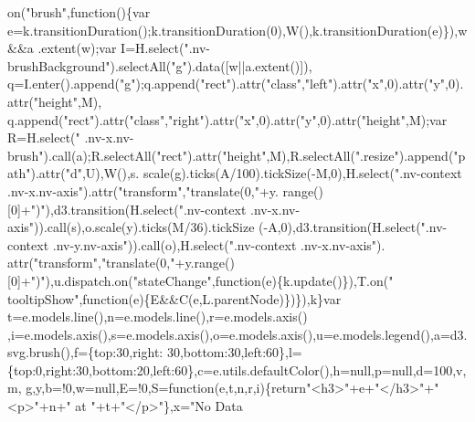 \begin{DoxyCode}
{      on(\textcolor{stringliteral}{"brush"},\textcolor{keyword}{function}()\{var e=k.transitionDuration();k.transitionDuration(0),W(),k.transitionDuration(e)\}),w&&a
      .extent(w);var I=H.select(\textcolor{stringliteral}{".nv-brushBackground"}).selectAll(\textcolor{stringliteral}{"g"}).data([w||a.extent()]),
      q=I.enter().append(\textcolor{stringliteral}{"g"});q.append(\textcolor{stringliteral}{"rect"}).attr(\textcolor{stringliteral}{"class"},\textcolor{stringliteral}{"left"}).attr(\textcolor{stringliteral}{"x"},0).attr(\textcolor{stringliteral}{"y"},0).attr(\textcolor{stringliteral}{"height"},M),
      q.append(\textcolor{stringliteral}{"rect"}).attr(\textcolor{stringliteral}{"class"},\textcolor{stringliteral}{"right"}).attr(\textcolor{stringliteral}{"x"},0).attr(\textcolor{stringliteral}{"y"},0).attr(\textcolor{stringliteral}{"height"},M);var R=H.select(\textcolor{stringliteral}{"
      .nv-x.nv-brush"}).call(a);R.selectAll(\textcolor{stringliteral}{"rect"}).attr(\textcolor{stringliteral}{"height"},M),R.selectAll(\textcolor{stringliteral}{".resize"}).append(\textcolor{stringliteral}{"path"}).attr(\textcolor{stringliteral}{"d"},U),W(),s.
      scale(g).ticks(A/100).tickSize(-M,0),H.select(\textcolor{stringliteral}{".nv-context .nv-x.nv-axis"}).attr(\textcolor{stringliteral}{"transform"},\textcolor{stringliteral}{"translate(0,"}+y.
      range()[0]+\textcolor{stringliteral}{")"}),d3.transition(H.select(\textcolor{stringliteral}{".nv-context .nv-x.nv-axis"})).call(s),o.scale(y).ticks(M/36).tickSize
      (-A,0),d3.transition(H.select(\textcolor{stringliteral}{".nv-context .nv-y.nv-axis"})).call(o),H.select(\textcolor{stringliteral}{".nv-context .nv-x.nv-axis"}).
      attr(\textcolor{stringliteral}{"transform"},\textcolor{stringliteral}{"translate(0,"}+y.range()[0]+\textcolor{stringliteral}{")"}),u.dispatch.on(\textcolor{stringliteral}{"stateChange"},\textcolor{keyword}{function}(e)\{k.update()\}),T.on(\textcolor{stringliteral}{"
      tooltipShow"},\textcolor{keyword}{function}(e)\{E&&C(e,L.parentNode)\})\}),k\}var t=e.models.line(),n=e.models.line(),r=e.models.axis()
      ,i=e.models.axis(),s=e.models.axis(),o=e.models.axis(),u=e.models.legend(),a=d3.svg.brush(),f=\{top:30,right:
      30,bottom:30,left:60\},l=\{top:0,right:30,bottom:20,left:60\},c=e.utils.defaultColor(),h=null,p=null,d=100,v,m,
      g,y,b=!0,w=null,E=!0,S=\textcolor{keyword}{function}(e,t,n,r,i)\{\textcolor{keywordflow}{return}\textcolor{stringliteral}{"<h3>"}+e+\textcolor{stringliteral}{"</h3>"}+\textcolor{stringliteral}{"<p>"}+n+\textcolor{stringliteral}{" at "}+t+\textcolor{stringliteral}{"</p>"}\},x=\textcolor{stringliteral}{"No Data
}}
\end{DoxyCode}

